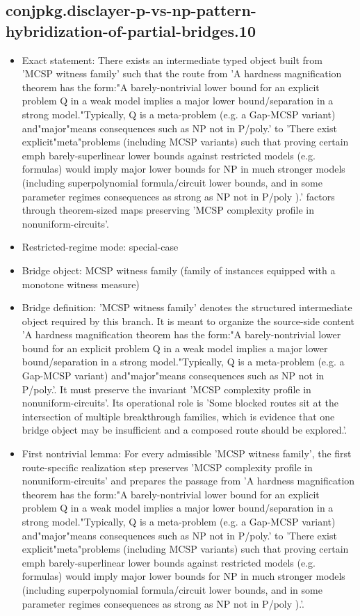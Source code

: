 \documentclass[11pt]{article}
\begin{document}
\subsection*{conjpkg.disclayer-p-vs-np-pattern-hybridization-of-partial-bridges.10}
\begin{itemize}
\item Exact statement: There exists an intermediate typed object built from 'MCSP witness family' such that the route from 'A hardness magnification theorem has the form:"A barely-nontrivial lower bound for an explicit problem Q in a weak model implies a major lower bound/separation in a strong model."Typically, Q is a meta-problem (e.g. a Gap-MCSP variant) and"major"means consequences such as NP not in P/poly.' to 'There exist explicit"meta"problems (including MCSP variants) such that proving certain emph barely-superlinear lower bounds against restricted models (e.g. formulas) would imply major lower bounds for NP in much stronger models (including superpolynomial formula/circuit lower bounds, and in some parameter regimes consequences as strong as NP not in P/poly ).' factors through theorem-sized maps preserving 'MCSP complexity profile in nonuniform-circuits'.
\item Restricted-regime mode: special-case
\item Bridge object: MCSP witness family (family of instances equipped with a monotone witness measure)
\item Bridge definition: 'MCSP witness family' denotes the structured intermediate object required by this branch. It is meant to organize the source-side content 'A hardness magnification theorem has the form:"A barely-nontrivial lower bound for an explicit problem Q in a weak model implies a major lower bound/separation in a strong model."Typically, Q is a meta-problem (e.g. a Gap-MCSP variant) and"major"means consequences such as NP not in P/poly.'. It must preserve the invariant 'MCSP complexity profile in nonuniform-circuits'. Its operational role is 'Some blocked routes sit at the intersection of multiple breakthrough families, which is evidence that one bridge object may be insufficient and a composed route should be explored.'.
\item First nontrivial lemma: For every admissible 'MCSP witness family', the first route-specific realization step preserves 'MCSP complexity profile in nonuniform-circuits' and prepares the passage from 'A hardness magnification theorem has the form:"A barely-nontrivial lower bound for an explicit problem Q in a weak model implies a major lower bound/separation in a strong model."Typically, Q is a meta-problem (e.g. a Gap-MCSP variant) and"major"means consequences such as NP not in P/poly.' to 'There exist explicit"meta"problems (including MCSP variants) such that proving certain emph barely-superlinear lower bounds against restricted models (e.g. formulas) would imply major lower bounds for NP in much stronger models (including superpolynomial formula/circuit lower bounds, and in some parameter regimes consequences as strong as NP not in P/poly ).'.

\end{itemize}
\end{document}
